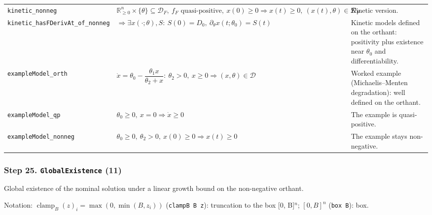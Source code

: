 {\begin{longtable}{@{}>{\raggedright\arraybackslash}p{3.6cm}>{\raggedright\arraybackslash}p{6.6cm}>{\raggedright\arraybackslash}p{5.6cm}@{}}
\texttt{kinetic\_\allowbreak{}nonneg} & $\displaystyle \mathbb{R}^n_{\ge0}\times\{\theta\}\subseteq\mathcal D_F,\ f_F\text{ quasi-positive},\ x(0)\ge0\Rightarrow x(t)\ge0,\ (x(t),\theta)\in\mathcal D_F$ & Kinetic version. \\[3pt]
\texttt{kinetic\_\allowbreak{}hasFDerivAt\_\allowbreak{}of\_\allowbreak{}nonneg} & $\displaystyle \Rightarrow\exists x(\cdot;\theta),S:\ S(0)=D_0,\ \partial_\theta x(t;\theta_0)=S(t)$ & Kinetic models defined on the orthant: positivity plus existence near $\theta_0$ and differentiability. \\[3pt]
\texttt{exampleModel\_\allowbreak{}orth} & $\displaystyle \dot x=\theta_0-\dfrac{\theta_1x}{\theta_2+x}:\ \theta_2>0,\ x\ge0\Rightarrow(x,\theta)\in\mathcal D$ & Worked example (Michaelis--Menten degradation): well defined on the orthant. \\[3pt]
\texttt{exampleModel\_\allowbreak{}qp} & $\displaystyle \theta_0\ge0,\ x=0\Rightarrow\dot x\ge0$ & The example is quasi-positive. \\[3pt]
\texttt{exampleModel\_\allowbreak{}nonneg} & $\displaystyle \theta_0\ge0,\ \theta_2>0,\ x(0)\ge0\Rightarrow x(t)\ge0$ & The example stays non-negative. \\[3pt]
\bottomrule
\end{longtable}
}

\subsubsection*{Step 25. \texttt{GlobalExistence} (11)}
Global existence of the nominal solution under a linear growth bound on the non-negative orthant.

{\small\raggedright Notation: $\operatorname{clamp}_B(z)_i=\max(0,\min(B,z_i))$ (\texttt{clampB B z}): truncation to the box [0, B]$^n$; $[0,B]^n$ (\texttt{box B}): box.}

